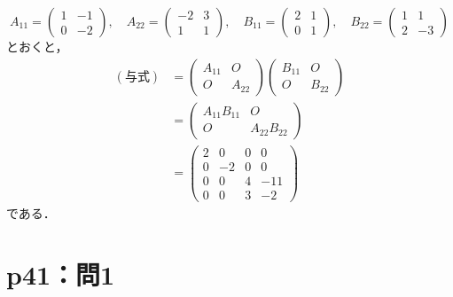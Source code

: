 \begin{tanswer}
  \[
    A_{11} = \begin{pmatrix} 1 & -1 \\ 0 & -2 \end{pmatrix},\quad A_{22} = \begin{pmatrix} -2 & 3 \\ 1 & 1 \end{pmatrix} ,\quad B_{11} = \begin{pmatrix} 2 & 1 \\ 0 & 1\end{pmatrix} ,\quad B_{22}= \begin{pmatrix} 1 & 1 \\ 2 & -3 \end{pmatrix}
  \]
  とおくと，
  \begin{align*}
    (\text{与式}) & = \begin{pmatrix} A_{11} & O \\ O & A_{22} \end{pmatrix} \begin{pmatrix} B_{11} & O \\ O & B_{22} \end{pmatrix} \\
                & = \begin{pmatrix} A_{11} B_{11} & O \\ O & A_{22} B_{22} \end{pmatrix}                                          \\
                & = \begin{pmatrix} 2 & 0 & 0 & 0 \\ 0 & -2 & 0 & 0 \\ 0 & 0 & 4 & -11 \\ 0 & 0 & 3 & -2 \end{pmatrix}
  \end{align*}
  である．
\end{tanswer}

\section*{p41：問1}
%

